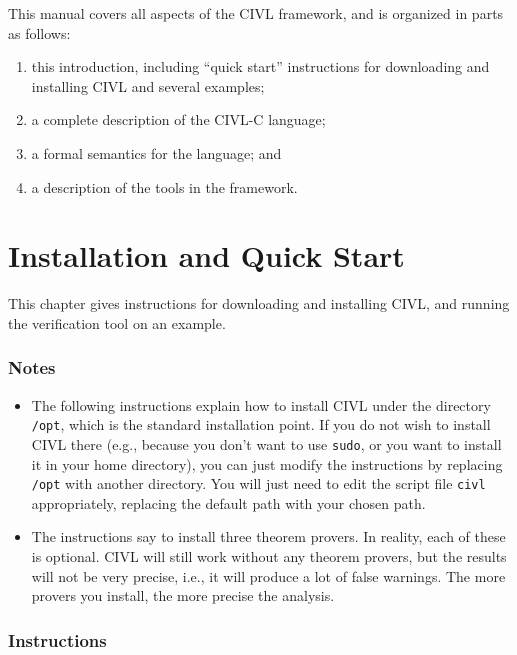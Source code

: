 This manual covers all aspects of the CIVL framework, and is organized in parts
as follows:
\begin{enumerate}
\item this introduction, including ``quick start'' instructions for
  downloading and installing CIVL and several examples;
\item a complete description of the CIVL-C language;
\item a formal semantics for the language; and
\item a description of the tools in the framework.
\end{enumerate}

\chapter{Installation and Quick Start}

This chapter gives instructions for downloading and installing CIVL,
and running the verification tool on an example.

\subsection*{Notes}

\begin{itemize}
\item The following instructions explain how to install CIVL under the
  directory \texttt{/opt}, which is the standard installation
  point. If you do not wish to install CIVL there (e.g., because you
  don't want to use \texttt{sudo}, or you want to install it in your
  home directory), you can just modify the instructions by replacing
  \texttt{/opt} with another directory. You will just need to edit the
  script file \texttt{civl} appropriately, replacing the default path
  with your chosen path.
\item The instructions say to install three theorem provers.  In
  reality, each of these is optional.  CIVL will still work without
  any theorem provers, but the results will not be very precise, i.e.,
  it will produce a lot of false warnings.  The more provers you
  install, the more precise the analysis.
\end{itemize}

\subsection*{Instructions}

